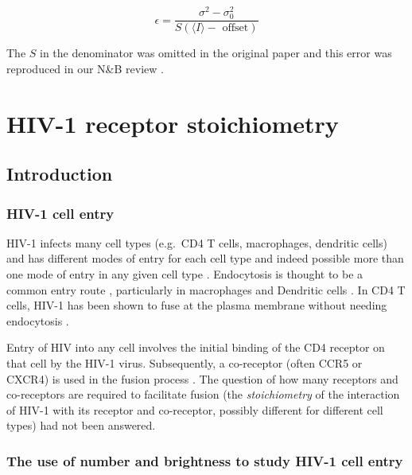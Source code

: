 \documentclass[12pt,]{book}
\theoremstyle{definition}
\theoremstyle{definition}
\theoremstyle{definition}
\theoremstyle{remark}
\begin{document}
\begin{equation}
\epsilon = \frac{\sigma^2 - \sigma_0^2}{S(\langle I \rangle - \text{ offset})}
\label{eq:dalaleq}
\end{equation}

The \(S\) in the denominator was omitted in the original paper
\citep{Dalal} and this error was reproduced in our N\&B review
\citep{NBreview}.

\section{HIV-1 receptor
stoichiometry}\label{hiv-1-receptor-stoichiometry}

\subsection{Introduction}\label{introduction-2}

\subsubsection{HIV-1 cell entry}\label{hiv-1-cell-entry}

HIV-1 infects many cell types (e.g.~CD4 T cells, macrophages, dendritic
cells) and has different modes of entry for each cell type and indeed
possible more than one mode of entry in any given cell type
\citep{Jakobsdottir}. Endocytosis is thought to be a common entry route
\citep{Miyauchi}, particularly in macrophages \citep{Marechal} and
Dendritic cells \citep{Mnager}. In CD4 T cells, HIV-1 has been shown to
fuse at the plasma membrane without needing endocytosis \citep{Herold}.

Entry of HIV into any cell involves the initial binding of the CD4
receptor on that cell by the HIV-1 virus. Subsequently, a co-receptor
(often CCR5 or CXCR4) is used in the fusion process
\citep{Jakobsdottir}. The question of how many receptors and
co-receptors are required to facilitate fusion (the \emph{stoichiometry}
of the interaction of HIV-1 with its receptor and co-receptor, possibly
different for different cell types) had not been answered.

\subsubsection{The use of number and brightness to study HIV-1 cell
entry}\label{the-use-of-number-and-brightness-to-study-hiv-1-cell-entry}
\end{document}
